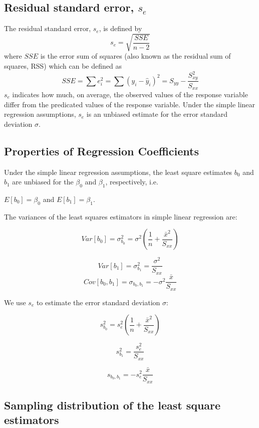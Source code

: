 \documentclass[
]{article}
\begin{document}
\hypertarget{residual-standard-error-s_e}{%
\subsection{\texorpdfstring{Residual standard error,
\(s_e\)}{Residual standard error, s\_e}}\label{residual-standard-error-s_e}}

The residual standard error, \(s_e\), is defined by
\[s_e=\sqrt{\frac{SSE}{n-2}}\] where \(SSE\) is the error sum of squares
(also known as the residual sum of squares, RSS) which can be defined as
\[SSE=\sum e^2_i=\sum(y_i-\hat{y}_i)^2=S_{yy}-\frac{S^2_{xy}}{S_{xx}}\]
\(s_e\) indicates how much, on average, the observed values of the
response variable differ from the predicated values of the response
variable. Under the simple linear regression assumptions, \(s_e\) is an
unbiased estimate for the error standard deviation \(\sigma\).

\hypertarget{properties-of-regression-coefficients}{%
\subsection{Properties of Regression
Coefficients}\label{properties-of-regression-coefficients}}

Under the simple linear regression assumptions, the least square
estimates \(b_0\) and \(b_1\) are unbiased for the \(\beta_0\) and
\(\beta_1\), respectively, i.e.

\(E[b_0]=\beta_0\) and \(E[b_1]=\beta_1\).

The variances of the least squares estimators in simple linear
regression are:

\[Var[b_0]=\sigma^2_{b_0}=\sigma^2\left(\frac{1}{n}+\frac{\bar{x}^2}{S_{xx}}\right)\]

\[Var[b_1]=\sigma^2_{b_1}=\frac{\sigma^2}{S_{xx}}\]
\[Cov[b_0,b_1]=\sigma_{b_0,b_1}=-\sigma^2\frac{\bar{x}}{S_{xx}}\]

We use \(s_e\) to estimate the error standard deviation \(\sigma\):

\[s^2_{b_0}=s_e^2\left(\frac{1}{n}+\frac{\bar{x}^2}{S_{xx}}\right)\]

\[s^2_{b_1}=\frac{s_e^2}{S_{xx}}\]

\[s_{b_0,b_1}=-s_e^2\frac{\bar{x}}{S_{xx}}\]

\hypertarget{sampling-distribution-of-the-least-square-estimators}{%
\subsection{Sampling distribution of the least square
estimators}\label{sampling-distribution-of-the-least-square-estimators}}
\end{document}
